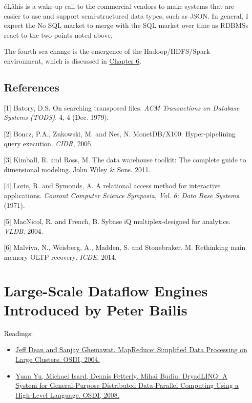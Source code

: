 \documentclass[b5paper,11pt,twoside,openright]{book}
\newcommand\Chapter[3]{
  \hypertarget{#1}{
    \chapter[#2]{#2\\{\Large #3}}
  }
}
\begin{document}
éĽâhis is a wake-up call to the commercial vendors to make systems that
are easier to use and support semi-structured data types, such as JSON.
In general, I expect the No SQL market to merge with the SQL market over
time as RDBMSs react to the two points noted above.

The fourth sea change is the emergence of the Hadoop/HDFS/Spark
environment, which is discussed in \hyperref[ch6-isolation]{Chapter 6}.

\section*{References}

\leavevmode\hypertarget{ref-earlycolumn1}{}%
{[}1{]} Batory, D.S. On searching transposed files. \emph{ACM
  Transactions on Database Systems (TODS)}. 4, 4 (Dec. 1979).

\leavevmode\hypertarget{ref-monetdb}{}%
{[}2{]} Boncz, P.A., Zukowski, M. and Nes, N. MonetDB/X100:
Hyper-pipelining query execution. \emph{CIDR}, 2005.

\leavevmode\hypertarget{ref-kimball-book}{}%
{[}3{]} Kimball, R. and Ross, M. The data warehouse toolkit: The
complete guide to dimensional modeling. John Wiley \& Sons. 2011.

\leavevmode\hypertarget{ref-earlycolumn2}{}%
{[}4{]} Lorie, R. and Symonds, A. A relational access method for
interactive applications. \emph{Courant Computer Science Symposia, Vol.
  6: Data Base Systems}. (1971).

\leavevmode\hypertarget{ref-sybase}{}%
{[}5{]} MacNicol, R. and French, B. Sybase iQ multiplex-designed for
analytics. \emph{VLDB}, 2004.

\leavevmode\hypertarget{ref-commandlogging}{}%
{[}6{]} Malviya, N., Weisberg, A., Madden, S. and Stonebraker, M.
Rethinking main memory OLTP recovery. \emph{ICDE}, 2014.



\Chapter{ch5-dataflow}{%
Large-Scale Dataflow Engines
}{%
Introduced by Peter Bailis
}

\begin{framed}
Readings:
\begin{itemize}
\item
\href{https://scholar.google.com/scholar?cluster=10940266603640308767}{Jeff
  Dean and Sanjay Ghemawat. {MapReduce: Simplified Data Processing on
    Large Clusters}. {OSDI}, 2004.}
\item
\href{https://scholar.google.com/scholar?cluster=3662601067977846800}{Yuan
  Yu, Michael Isard, Dennis Fetterly, Mihai Budiu. {DryadLINQ: A System
    for General-Purpose Distributed Data-Parallel Computing Using a
    High-Level Language}. {OSDI}, 2008.}
\end{itemize}
\end{framed}
\end{document}
